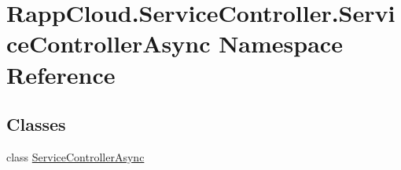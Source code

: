 \hypertarget{namespaceRappCloud_1_1ServiceController_1_1ServiceControllerAsync}{\section{Rapp\-Cloud.\-Service\-Controller.\-Service\-Controller\-Async Namespace Reference}
\label{namespaceRappCloud_1_1ServiceController_1_1ServiceControllerAsync}
}
\subsection*{Classes}
\begin{DoxyCompactItemize}
\item 
class \hyperlink{classRappCloud_1_1ServiceController_1_1ServiceControllerAsync_1_1ServiceControllerAsync}{Service\-Controller\-Async}
\end{DoxyCompactItemize}
